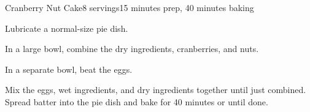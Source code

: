 \documentclass[../Cookbook.tex]{subfiles}
\begin{document}
\begin{recipe}{Cranberry Nut Cake}{8 servings}{15 minutes prep, 40 minutes baking}

Lubricate a normal-size pie dish. 

In a large bowl, combine the dry ingredients, cranberries, and nuts.

In a separate bowl, beat the eggs.

Mix the eggs, wet ingredients, and dry ingredients together until just combined. Spread batter into the pie dish and bake for 40 minutes or until done.

\end{recipe}
\end{document}
